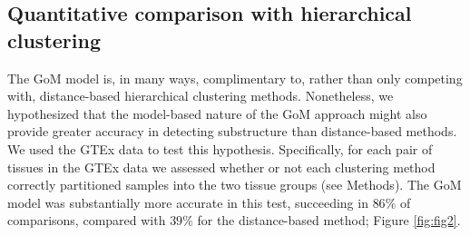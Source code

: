 




\subsection{Quantitative comparison with hierarchical clustering}

The GoM model is, in many ways,  complimentary to, rather than only competing with, distance-based hierarchical clustering methods.
Nonetheless, we hypothesized that the model-based nature of the GoM approach might also provide greater accuracy in detecting substructure than distance-based methods. 
We used the GTEx data to test this hypothesis. Specifically, for each pair of tissues in the GTEx data we assessed whether or not each clustering method
correctly partitioned samples into the two tissue groups (see Methods). The GoM model was substantially more accurate in this test, succeeding
in $86 \%$ of comparisons, compared with $39 \%$ for the distance-based method; Figure \ref{fig:fig2}.



